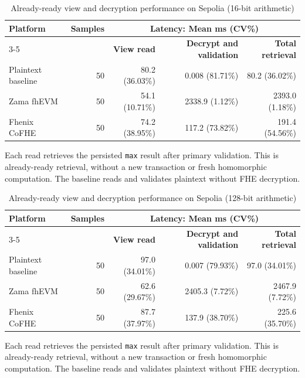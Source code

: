 \begin{table}[!t]
\caption{Already-ready view and decryption performance on Sepolia (16-bit arithmetic)}
\label{tab:ready-view-decrypt-sepolia-16}
\centering
\scriptsize
\setlength{\tabcolsep}{4pt}
\begin{tabular}{|l|r|rrr|}
\hline
\textbf{Platform} & \textbf{Samples} & \multicolumn{3}{c|}{\textbf{Latency: Mean ms (CV\%)}} \\
\cline{3-5}
& & \textbf{View read} & \textbf{Decrypt and validation} & \textbf{Total retrieval} \\
\hline
Plaintext baseline & 50 & 80.2 (36.03\%) & 0.008 (81.71\%) & 80.2 (36.02\%) \\
Zama fhEVM & 50 & 54.1 (10.71\%) & 2338.9 (1.12\%) & 2393.0 (1.18\%) \\
Fhenix CoFHE & 50 & 74.2 (38.95\%) & 117.2 (73.82\%) & 191.4 (54.56\%) \\
\hline
\end{tabular}
\vspace{2pt}
\parbox{\textwidth}{\scriptsize Each read retrieves the persisted \texttt{max} result after primary validation. This is already-ready retrieval, without a new transaction or fresh homomorphic computation. The baseline reads and validates plaintext without FHE decryption.}
\end{table}

\begin{table}[!t]
\caption{Already-ready view and decryption performance on Sepolia (128-bit arithmetic)}
\label{tab:ready-view-decrypt-sepolia-128}
\centering
\scriptsize
\setlength{\tabcolsep}{4pt}
\begin{tabular}{|l|r|rrr|}
\hline
\textbf{Platform} & \textbf{Samples} & \multicolumn{3}{c|}{\textbf{Latency: Mean ms (CV\%)}} \\
\cline{3-5}
& & \textbf{View read} & \textbf{Decrypt and validation} & \textbf{Total retrieval} \\
\hline
Plaintext baseline & 50 & 97.0 (34.01\%) & 0.007 (79.93\%) & 97.0 (34.01\%) \\
Zama fhEVM & 50 & 62.6 (29.67\%) & 2405.3 (7.72\%) & 2467.9 (7.72\%) \\
Fhenix CoFHE & 50 & 87.7 (37.97\%) & 137.9 (38.70\%) & 225.6 (35.70\%) \\
\hline
\end{tabular}
\vspace{2pt}
\parbox{\textwidth}{\scriptsize Each read retrieves the persisted \texttt{max} result after primary validation. This is already-ready retrieval, without a new transaction or fresh homomorphic computation. The baseline reads and validates plaintext without FHE decryption.}
\end{table}
